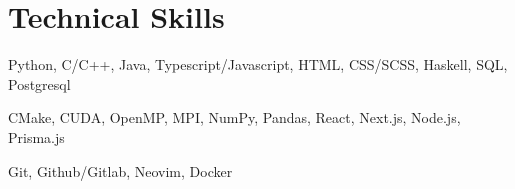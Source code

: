 \section{Technical Skills}
\resumeSubHeadingListStart

{Python, C/C++, Java, Typescript/Javascript, HTML, CSS/SCSS, Haskell, SQL, Postgresql}

{CMake, CUDA, OpenMP, MPI, NumPy, Pandas, React, Next.js, Node.js, Prisma.js}

{Git, Github/Gitlab, Neovim, Docker}

\resumeSubHeadingListEnd
